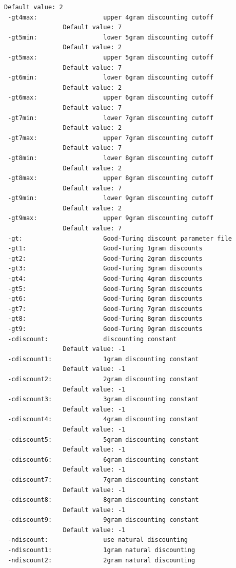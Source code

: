 \documentclass[11pt]{article}
\begin{document}
\begin{Verbatim}[commandchars=\\\{\}]
                Default value: 2
 -gt4max:                  upper 4gram discounting cutoff
                Default value: 7
 -gt5min:                  lower 5gram discounting cutoff
                Default value: 2
 -gt5max:                  upper 5gram discounting cutoff
                Default value: 7
 -gt6min:                  lower 6gram discounting cutoff
                Default value: 2
 -gt6max:                  upper 6gram discounting cutoff
                Default value: 7
 -gt7min:                  lower 7gram discounting cutoff
                Default value: 2
 -gt7max:                  upper 7gram discounting cutoff
                Default value: 7
 -gt8min:                  lower 8gram discounting cutoff
                Default value: 2
 -gt8max:                  upper 8gram discounting cutoff
                Default value: 7
 -gt9min:                  lower 9gram discounting cutoff
                Default value: 2
 -gt9max:                  upper 9gram discounting cutoff
                Default value: 7
 -gt:                      Good-Turing discount parameter file
 -gt1:                     Good-Turing 1gram discounts
 -gt2:                     Good-Turing 2gram discounts
 -gt3:                     Good-Turing 3gram discounts
 -gt4:                     Good-Turing 4gram discounts
 -gt5:                     Good-Turing 5gram discounts
 -gt6:                     Good-Turing 6gram discounts
 -gt7:                     Good-Turing 7gram discounts
 -gt8:                     Good-Turing 8gram discounts
 -gt9:                     Good-Turing 9gram discounts
 -cdiscount:               discounting constant
                Default value: -1
 -cdiscount1:              1gram discounting constant
                Default value: -1
 -cdiscount2:              2gram discounting constant
                Default value: -1
 -cdiscount3:              3gram discounting constant
                Default value: -1
 -cdiscount4:              4gram discounting constant
                Default value: -1
 -cdiscount5:              5gram discounting constant
                Default value: -1
 -cdiscount6:              6gram discounting constant
                Default value: -1
 -cdiscount7:              7gram discounting constant
                Default value: -1
 -cdiscount8:              8gram discounting constant
                Default value: -1
 -cdiscount9:              9gram discounting constant
                Default value: -1
 -ndiscount:               use natural discounting
 -ndiscount1:              1gram natural discounting
 -ndiscount2:              2gram natural discounting

\end{Verbatim}
\end{document}
